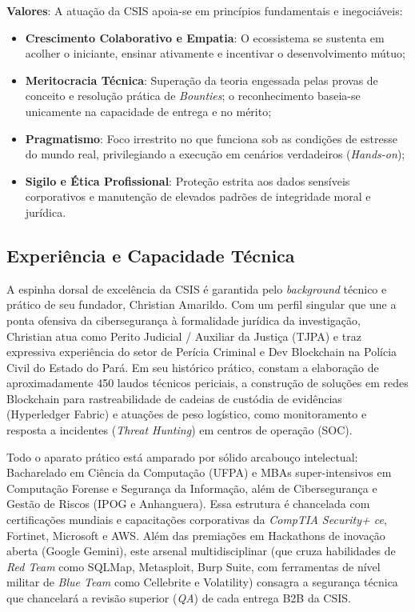 \documentclass[../main.tex]{subfiles}
\begin{document}
\textbf{Valores}: A atuação da CSIS apoia-se em princípios fundamentais e inegociáveis:
\begin{itemize}
    \item \textbf{Crescimento Colaborativo e Empatia}: O ecossistema se sustenta em acolher o iniciante, ensinar ativamente e incentivar o desenvolvimento mútuo;
    \item \textbf{Meritocracia Técnica}: Superação da teoria engessada pelas provas de conceito e resolução prática de \textit{Bounties}; o reconhecimento baseia-se unicamente na capacidade de entrega e no mérito;
    \item \textbf{Pragmatismo}: Foco irrestrito no que funciona sob as condições de estresse do mundo real, privilegiando a execução em cenários verdadeiros (\textit{Hands-on});
    \item \textbf{Sigilo e Ética Profissional}: Proteção estrita aos dados sensíveis corporativos e manutenção de elevados padrões de integridade moral e jurídica.
\end{itemize}


\subsection{Experiência e Capacidade Técnica}

A espinha dorsal de excelência da CSIS é garantida pelo \textit{background} técnico e prático de seu fundador, Christian Amarildo. Com um perfil singular que une a ponta ofensiva da cibersegurança à formalidade jurídica da investigação, Christian atua como Perito Judicial / Auxiliar da Justiça (TJPA) e traz expressiva experiência do setor de Perícia Criminal e Dev Blockchain na Polícia Civil do Estado do Pará. Em seu histórico prático, constam a elaboração de aproximadamente 450 laudos técnicos periciais, a construção de soluções em redes Blockchain para rastreabilidade de cadeias de custódia de evidências (Hyperledger Fabric) e atuações de peso logístico, como monitoramento e resposta a incidentes (\textit{Threat Hunting}) em centros de operação (SOC).

Todo o aparato prático está amparado por sólido arcabouço intelectual: Bacharelado em Ciência da Computação (UFPA) e MBAs super-intensivos em Computação Forense e Segurança da Informação, além de Cibersegurança e Gestão de Riscos (IPOG e Anhanguera). Essa estrutura é chancelada com certificações mundiais e capacitações corporativas da \textit{CompTIA Security+ ce}, Fortinet, Microsoft e AWS. Além das premiações em Hackathons de inovação aberta (Google Gemini), este arsenal multidisciplinar (que cruza habilidades de \textit{Red Team} como SQLMap, Metasploit, Burp Suite, com ferramentas de nível militar de \textit{Blue Team} como Cellebrite e Volatility) consagra a segurança técnica que chancelará a revisão superior (\textit{QA}) de cada entrega B2B da CSIS.
\end{document}
